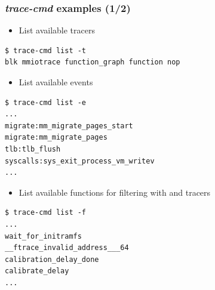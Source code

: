 \begin{frame}[fragile]
  \frametitle{{\em trace-cmd} examples (1/2)}
  \begin{itemize}
    \item List available tracers
  \end{itemize}
  \begin{block}{}
    \begin{verbatim}
$ trace-cmd list -t
blk mmiotrace function_graph function nop
    \end{verbatim}
  \end{block}
  \begin{itemize}
    \item List available events
  \end{itemize}
  \begin{block}{}
    \begin{verbatim}
$ trace-cmd list -e
...
migrate:mm_migrate_pages_start
migrate:mm_migrate_pages
tlb:tlb_flush
syscalls:sys_exit_process_vm_writev
...
    \end{verbatim}
  \end{block}
  
  \begin{itemize}
    \item List available functions for filtering with  and
         tracers
  \end{itemize}
  \begin{block}{}
    \begin{verbatim}
$ trace-cmd list -f
...
wait_for_initramfs
__ftrace_invalid_address___64
calibration_delay_done
calibrate_delay
...
    \end{verbatim}
  \end{block}


\end{frame}

